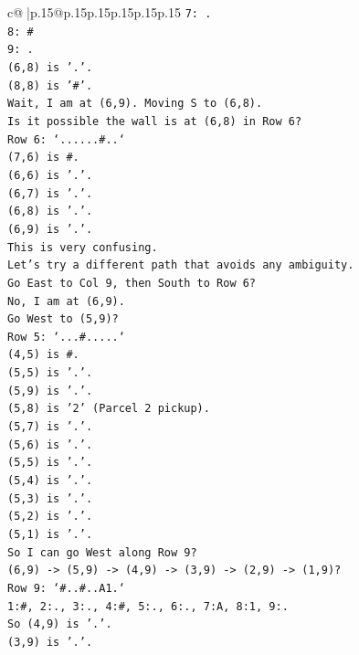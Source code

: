 \documentclass{article}
\begin{document}
{\begin{supertabular}{c@{$\;$}|p{.15\linewidth}@{}p{.15\linewidth}p{.15\linewidth}p{.15\linewidth}p{.15\linewidth}p{.15\linewidth}}
{{{\texttt{7: .} \\
\texttt{8: \#} \\
\texttt{9: .} \\
\texttt{(6,8) is '.'.} \\
\texttt{(8,8) is '\#'.} \\
\texttt{Wait, I am at (6,9). Moving S to (6,8).} \\
\texttt{Is it possible the wall is at (6,8) in Row 6?} \\
\texttt{Row 6: `......\#..`} \\
\texttt{(7,6) is \#.} \\
\texttt{(6,6) is '.'.} \\
\texttt{(6,7) is '.'.} \\
\texttt{(6,8) is '.'.} \\
\texttt{(6,9) is '.'.} \\
\texttt{This is very confusing.} \\
\texttt{Let's try a different path that avoids any ambiguity.} \\
\texttt{Go East to Col 9, then South to Row 6?} \\
\texttt{No, I am at (6,9).} \\
\texttt{Go West to (5,9)?} \\
\texttt{Row 5: `...\#.....`} \\
\texttt{(4,5) is \#.} \\
\texttt{(5,5) is '.'.} \\
\texttt{(5,9) is '.'.} \\
\texttt{(5,8) is '2' (Parcel 2 pickup).} \\
\texttt{(5,7) is '.'.} \\
\texttt{(5,6) is '.'.} \\
\texttt{(5,5) is '.'.} \\
\texttt{(5,4) is '.'.} \\
\texttt{(5,3) is '.'.} \\
\texttt{(5,2) is '.'.} \\
\texttt{(5,1) is '.'.} \\
\texttt{So I can go West along Row 9?} \\
\texttt{(6,9) {-}> (5,9) {-}> (4,9) {-}> (3,9) {-}> (2,9) {-}> (1,9)?} \\
\texttt{Row 9: `\#..\#..A1.`} \\
\texttt{1:\#, 2:., 3:., 4:\#, 5:., 6:., 7:A, 8:1, 9:.} \\
\texttt{So (4,9) is '.'.} \\
\texttt{(3,9) is '.'.} \\
}}}
\end{supertabular}}
\end{document}

